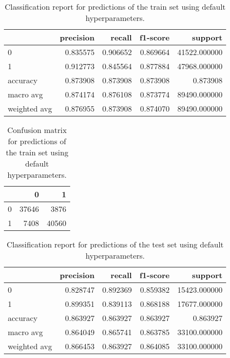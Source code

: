 \documentclass{article}
\begin{document}
\begin{itemize}
\begin{table}[h!]
\centering
\begin{tabular}{lrrrr}
\toprule
{} &  precision &    recall &  f1-score &       support \\
\midrule
0            &   0.835575 &  0.906652 &  0.869664 &  41522.000000 \\
1            &   0.912773 &  0.845564 &  0.877884 &  47968.000000 \\
accuracy     &   0.873908 &  0.873908 &  0.873908 &      0.873908 \\
macro avg    &   0.874174 &  0.876108 &  0.873774 &  89490.000000 \\
weighted avg &   0.876955 &  0.873908 &  0.874070 &  89490.000000 \\
\bottomrule
\end{tabular}

\caption{Classification report for predictions of the train set using default hyperparameters.}
\label{table:model_tr_cr}
\end{table}

\begin{table}[h!]
\centering
\begin{tabular}{lrr}
\toprule
{} &      0 &      1 \\
\midrule
0 &  37646 &   3876 \\
1 &   7408 &  40560 \\
\bottomrule
\end{tabular}
\caption{Confusion matrix for predictions of the train set using default hyperparameters.}
\label{table:model_tr_cm}
\end{table}

\begin{table}[h!]
\centering
\begin{tabular}{lrrrr}
\toprule
{} &  precision &    recall &  f1-score &       support \\
\midrule
0            &   0.828747 &  0.892369 &  0.859382 &  15423.000000 \\
1            &   0.899351 &  0.839113 &  0.868188 &  17677.000000 \\
accuracy     &   0.863927 &  0.863927 &  0.863927 &      0.863927 \\
macro avg    &   0.864049 &  0.865741 &  0.863785 &  33100.000000 \\
weighted avg &   0.866453 &  0.863927 &  0.864085 &  33100.000000 \\
\bottomrule
\end{tabular}
\caption{Classification report for predictions of the test set using default hyperparameters.}
\label{table:model_te_cr}
\end{table}
 

\end{itemize}
\end{document}
